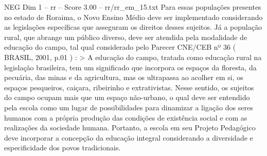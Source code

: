 \begin{textsample}{NEG Dim 1 – rr – Score 3.00 – rr/rr\_em\_15.txt}
Para essas populações presentes no estado de Roraima, o Novo Ensino Médio deve ser implementado considerando as legislações específicas que asseguram os direitos desses sujeitos.
Já a população rural, que abrange um público diverso, deve ser atendida pela modalidade de educação do campo, tal qual considerado pelo Parecer CNE/CEB nº 36 ( BRASIL, 2001, p.01 ) : > A educação do campo, tratada como educação rural na legislação brasileira, tem um significado que incorpora os espaços da floresta, da pecuária, das minas e da agricultura, mas os ultrapassa ao acolher em si, os espaços pesqueiros, caiçara, ribeirinho e extrativistas.
Nesse sentido, os sujeitos do campo ocupam mais que um espaço não-urbano, o qual deve ser entendido pela escola como um lugar de possibilidades para dinamizar a ligação dos seres humanos com a própria produção das condições de existência social e com as realizações da sociedade humana.
Portanto, a escola em seu Projeto Pedagógico deve incorporar a concepção da educação integral considerando a diversidade e especificidade dos povos tradicionais.

\end{textsample}
